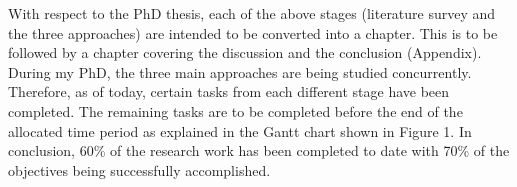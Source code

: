\documentclass{article}
\begin{document}
With respect to the PhD thesis, each of the above stages (literature survey and the three approaches) are intended to be converted into a chapter. This is to be followed by a chapter covering the discussion and the conclusion (Appendix). During my PhD, the three main approaches are being studied concurrently. Therefore, as of today, certain tasks from each different stage have been completed. The remaining tasks are to be completed before the end of the allocated time period as explained in the Gantt chart shown in Figure 1. In conclusion, 60\% of the research work has been completed to date with 70\% of the objectives being successfully accomplished.

\end{document}

